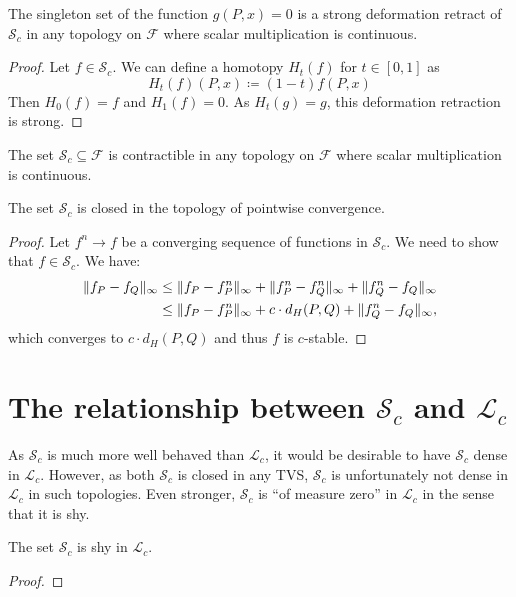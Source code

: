 \begin{theorem}
    The singleton set of the function $g(P, x) = 0$ is a strong deformation
    retract of $\mathcal{S}_c$ in any topology on $\mathcal{F}$ where scalar
    multiplication is continuous.
\end{theorem}
\begin{proof}
    Let $f \in \mathcal{S}_c$.
    We can define a homotopy $H_t(f)$ for $t \in [0, 1]$ as
    \begin{equation}
        H_t(f)(P, x) \coloneqq (1 - t)f(P, x)
    \end{equation}
    Then $H_0(f) = f$ and $H_1(f) = 0$.
    As $H_t(g) = g$, this deformation retraction is strong.
\end{proof}
\begin{corollary}
    The set $\mathcal{S}_c \subseteq \mathcal{F}$ is contractible in any
    topology on $\mathcal{F}$ where scalar multiplication is continuous.
\end{corollary}

\begin{theorem}
    The set $\mathcal{S}_c$ is closed in the topology of pointwise convergence.
\end{theorem}
\begin{proof}
    Let $f^n \to f$ be a converging sequence of functions in $\mathcal{S}_c$.
    We need to show that $f \in \mathcal{S}_c$.
    We have:
    \begin{align}
        \lVert f_P - f_Q\rVert_\infty & \leq \lVert f_P - f^n_P\rVert_\infty + \lVert f^n_P - f^n_Q\rVert_\infty + \lVert f^n_Q - f_Q\rVert_\infty \\
        & \leq \lVert f_P - f^n_P\rVert_\infty + c \cdot d_H(P, Q) + \lVert f^n_Q - f_Q\rVert_\infty,
    \end{align}
    which converges to $c \cdot d_H(P, Q)$ and thus $f$ is $c$-stable.
\end{proof}

\section{The relationship between $\mathcal{S}_c$ and $\mathcal{L}_c$}

As $\mathcal{S}_c$ is much more well behaved than $\mathcal{L}_c$,
it would be desirable to have $\mathcal{S}_c$ dense in $\mathcal{L}_c$.
However, as both $\mathcal{S}_c$ is closed in any TVS, $\mathcal{S}_c$ is
unfortunately not dense in $\mathcal{L}_c$ in such topologies.
Even stronger, $\mathcal{S}_c$ is ``of measure zero'' in $\mathcal{L}_c$
in the sense that it is shy.
\begin{theorem}
    The set $\mathcal{S}_c$ is shy in $\mathcal{L}_c$.
\end{theorem}
\begin{proof}
\end{proof}